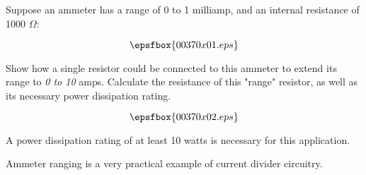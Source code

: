 

Suppose an ammeter has a range of 0 to 1 milliamp, and an internal resistance of 1000 $\Omega$:

$$\epsfbox{00370x01.eps}$$

Show how a single resistor could be connected to this ammeter to extend its range to {\it 0 to 10} amps.  Calculate the resistance of this "range" resistor, as well as its necessary power dissipation rating.







$$\epsfbox{00370x02.eps}$$

A power dissipation rating of at least 10 watts is necessary for this application.







Ammeter ranging is a very practical example of current divider circuitry.





